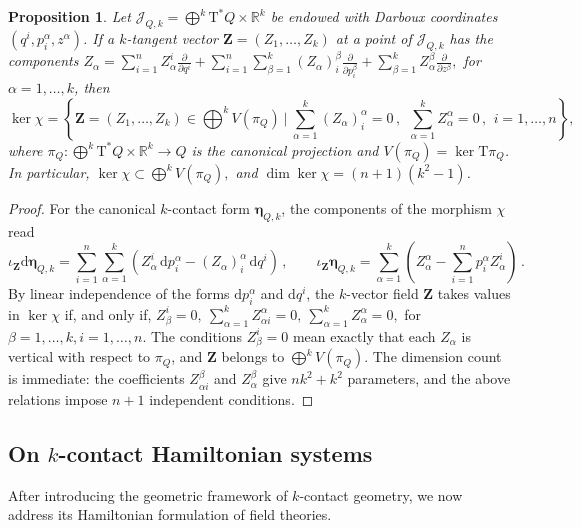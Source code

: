\documentclass[11pt,twoside]{article}
\theoremstyle{plain}
\newtheorem{proposition}[theorem]{Proposition} \newtheorem{corollary}[theorem]{Corollary}
\theoremstyle{definition}
\theoremstyle{remark}
\newcommand{\dd}{\mathrm{d}}
\newcommand{\T}{\mathrm{T}}
\begin{document}
\begin{proposition}\label{prop:kernel-flat-k-contact-Darboux}
Let \(\mathcal{J}_{Q,k}=\bigoplus^k \T^*Q\times \mathbb{R}^k\) be endowed with Darboux coordinates \((q^i,p_i^\alpha,z^\alpha)\). If a $k$-tangent vector \(\mathbf Z=(Z_1,\dots,Z_k)\) at a point of \( \mathcal{J}_{Q,k}\) has the components
\(
Z_\alpha=\sum_{i=1}^n Z_\alpha^i\frac{\partial}{\partial q^i}+\sum_{i=1}^n\sum_{\beta=1}^k (Z_{\alpha })_i^{\beta}\frac{\partial}{\partial p_i^\beta}+\sum_{\beta=1}^k Z_{\alpha}^{\beta}\frac{\partial}{\partial z^\beta},
\) for $\alpha=1,\ldots,k$, 
then 
\[
\ker\chi=\left\{\mathbf Z=(Z_1,\dots,Z_k)\in {\textstyle\bigoplus^k} V(\pi_Q) \ \Big\vert\  \sum_{\alpha=1}^k(Z_{\alpha })_i^{\alpha}=0\,,\ \ \sum_{\alpha=1}^k Z_\alpha^\alpha=0\,,\,\ i=1,\ldots,n\right\},
\]
where \(\pi_Q\colon\bigoplus^k\T^*Q\times\mathbb R^k\to Q\) is the canonical projection and \(V(\pi_Q)=\ker \T\pi_Q\). In particular,
\(
\ker\chi\subset \bigoplus^k V(\pi_Q),
\)
and \(\dim \ker\chi=(n+1)(k^2-1)\).
\end{proposition}

\begin{proof}
For the canonical $k$-contact form $\bm\eta_{Q,k}$, the components of the morphism $\chi$ read 
\[
\iota_{\mathbf Z}\dd\bm\eta_{Q,k}=\sum_{i=1}^n\sum_{\alpha=1}^k(Z_\alpha^i\,\dd p_i^\alpha-(Z_{\alpha})_i^{\alpha}\,\dd q^i)\,,\qquad
\iota_{\mathbf Z}\bm\eta_{Q,k}=\sum_{\alpha=1}^k(Z_\alpha^\alpha-\sum_{i=1}^np_i^\alpha Z_\alpha^i)\,.
\]
By linear independence of the forms \(\dd p_i^\alpha\) and \(\dd q^i\), the $k$-vector field \(\mathbf Z\) takes values in \(\ker\chi\) if, and only if,
\(
Z_\beta^i=0,\ \sum_{\alpha=1}^kZ_{\alpha i}^{\alpha}=0,\ \sum_{\alpha=1}^k Z_{\alpha}^{\alpha}=0,
\) for $\beta=1,\ldots,k, i=1,\ldots,n$. 
The conditions \(Z_\beta^i=0\) mean exactly that each \(Z_\alpha\) is vertical with respect to \(\pi_Q\), and \(\mathbf Z\) belongs to \(\bigoplus^kV(\pi_Q)\). The dimension count is immediate: the coefficients \(Z_{\alpha i}^{\beta}\) and \(Z_\alpha^\beta\) give \(nk^2+k^2\) parameters, and the above relations impose \(n+1\) independent conditions.
\end{proof}

\subsection{On \texorpdfstring{$k$}{}-contact Hamiltonian systems}
\label{sub:k-contact-Hamiltonian-systems}

After introducing the geometric framework of $k$-contact geometry, we now address its Hamiltonian formulation of field theories. 
\end{document}
